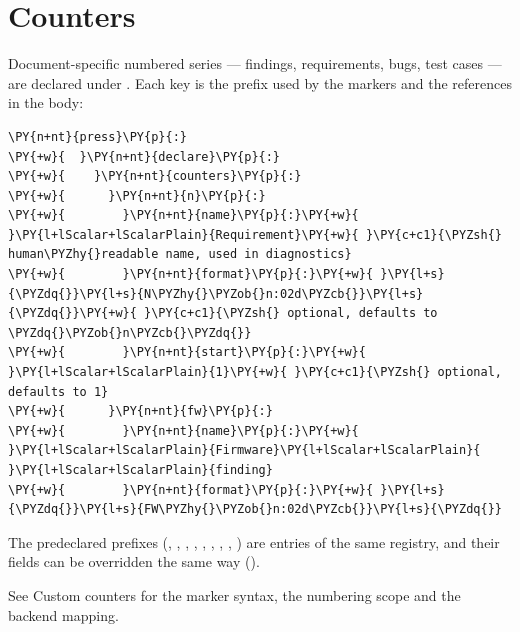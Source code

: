 \documentclass[a4paper,twoside]{article}
\begin{document}
\section{Counters}
Document-specific numbered series --- findings, requirements, bugs, test cases ---
are declared under . Each key is the prefix used by the
 markers and the  references in the body:
\begin{tscode}[lang=yaml, engine=pygments]
\begin{Verbatim}[commandchars=\\\{\},breaklines, breakanywhere, commandchars=\\\{\}]
\PY{n+nt}{press}\PY{p}{:}
\PY{+w}{  }\PY{n+nt}{declare}\PY{p}{:}
\PY{+w}{    }\PY{n+nt}{counters}\PY{p}{:}
\PY{+w}{      }\PY{n+nt}{n}\PY{p}{:}
\PY{+w}{        }\PY{n+nt}{name}\PY{p}{:}\PY{+w}{ }\PY{l+lScalar+lScalarPlain}{Requirement}\PY{+w}{ }\PY{c+c1}{\PYZsh{} human\PYZhy{}readable name, used in diagnostics}
\PY{+w}{        }\PY{n+nt}{format}\PY{p}{:}\PY{+w}{ }\PY{l+s}{\PYZdq{}}\PY{l+s}{N\PYZhy{}\PYZob{}n:02d\PYZcb{}}\PY{l+s}{\PYZdq{}}\PY{+w}{ }\PY{c+c1}{\PYZsh{} optional, defaults to \PYZdq{}\PYZob{}n\PYZcb{}\PYZdq{}}
\PY{+w}{        }\PY{n+nt}{start}\PY{p}{:}\PY{+w}{ }\PY{l+lScalar+lScalarPlain}{1}\PY{+w}{ }\PY{c+c1}{\PYZsh{} optional, defaults to 1}
\PY{+w}{      }\PY{n+nt}{fw}\PY{p}{:}
\PY{+w}{        }\PY{n+nt}{name}\PY{p}{:}\PY{+w}{ }\PY{l+lScalar+lScalarPlain}{Firmware}\PY{l+lScalar+lScalarPlain}{ }\PY{l+lScalar+lScalarPlain}{finding}
\PY{+w}{        }\PY{n+nt}{format}\PY{p}{:}\PY{+w}{ }\PY{l+s}{\PYZdq{}}\PY{l+s}{FW\PYZhy{}\PYZob{}n:02d\PYZcb{}}\PY{l+s}{\PYZdq{}}
\end{Verbatim}
\end{tscode}
The predeclared prefixes (, , , , , , ,
, ) are entries of the same registry, and their fields can be
overridden the same way ().

See Custom counters for the marker syntax, the
numbering scope and the backend mapping.
\end{document}
